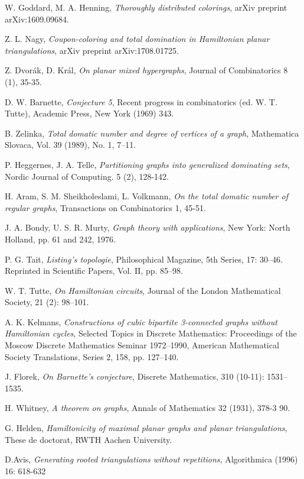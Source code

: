 \begin{thebibliography}{9}

W. Goddard, M. A. Henning,
\textit{Thoroughly distributed colorings},
arXiv preprint arXiv:1609.09684.

Z. L. Nagy,
\textit{Coupon-coloring and total domination in Hamiltonian planar triangulations},
arXiv preprint arXiv:1708.01725.

Z. Dvorák, D. Král,
\textit{On planar mixed hypergraphs},
Journal of Combinatorics 8 (1), 35-35.

D. W. Barnette,
\textit{Conjecture 5},
Recent progress in combinatorics (ed. W. T. Tutte), Academic Press, New York (1969) 343.


B. Zelinka,
\textit{Total domatic number and degree of vertices of a graph},
Mathematica Slovaca, Vol. 39 (1989), No. 1, 7--11.

P. Heggernes, J. A. Telle,
\textit{Partitioning graphs into generalized dominating sets},
Nordic Journal of Computing. 5 (2), 128-142.

H. Aram, S. M. Sheikholeslami, L. Volkmann,
\textit{On the total domatic number of regular graphs},
Transactions on Combinatorics 1, 45-51.

J. A. Bondy, U. S. R. Murty,
\textit{Graph theory with applications},
New York: North Holland, pp. 61 and 242, 1976.

P. G. Tait,
\textit{Listing's topologie},
Philosophical Magazine, 5th Series, 17: 30–46. Reprinted in Scientific Papers, Vol. II, pp. 85–98.

W. T. Tutte,
\textit{On Hamiltonian circuits},
Journal of the London Mathematical Society, 21 (2): 98–101.

A. K. Kelmans,
\textit{Constructions of cubic bipartite 3-connected graphs without Hamiltonian cycles},
Selected Topics in Discrete Mathematics: Proceedings of the Moscow Discrete Mathematics Seminar 1972–1990,
American Mathematical Society Translations, Series 2, 158, pp. 127–140.

J. Florek,
\textit{On Barnette's conjecture},
Discrete Mathematics, 310 (10-11): 1531–1535.

H. Whitney,
\textit{A theorem on graphs},
Annals of Mathematics 32 (1931), 378-3 90.

G. Helden,
\textit{Hamiltonicity of maximal planar graphs and planar triangulations},
These de doctorat, RWTH Aachen University.


D.Avis,
\textit{Generating rooted triangulations without repetitions},
Algorithmica (1996) 16: 618-632

\end{thebibliography}
